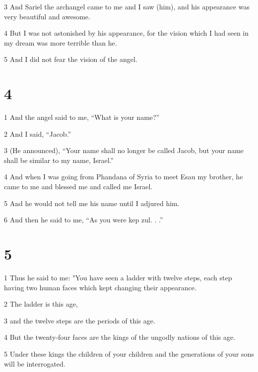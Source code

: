 \par 3 And Sariel the archangel came to me and I saw (him), and his appearance was very beautiful and awesome. 

\par 4 But I was not astonished by his appearance, for the vision which I had seen in my dream was more terrible than he. 

\par 5 And I did not fear the vision of the angel.

\chapter{4}

\par 1 And the angel said to me, “What is your name?”

\par 2 And I said, “Jacob.”

\par 3 (He announced), “Your name shall no longer be called Jacob, but your name shall be similar to my name, Israel.” 

\par 4 And when I was going from Phandana of Syria to meet Esau my brother, he came to me and blessed me and called me Israel.

\par 5 And he would not tell me his name until I adjured him. 

\par 6 And then he said to me, “As you were kep zul. . .”

\chapter{5}

\par 1 Thus he said to me: "You have seen a ladder with twelve steps, each step having two human faces which kept changing their appearance. 

\par 2 The ladder is this age, 

\par 3 and the twelve steps are the periods of this age. 

\par 4 But the twenty-four faces are the kings of the ungodly nations of this age. 

\par 5 Under these kings the children of your children and the generations of your sons will be interrogated. 

